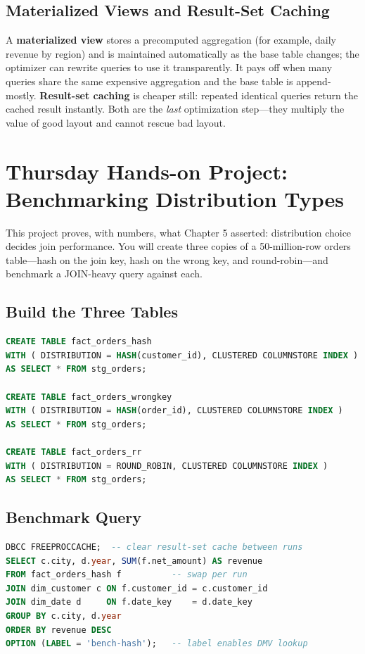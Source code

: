 \subsection{Materialized Views and Result-Set Caching}
A \textbf{materialized view} stores a precomputed aggregation (for example, daily revenue by region) and is maintained automatically as the base table changes; the optimizer can rewrite queries to use it transparently. It pays off when many queries share the same expensive aggregation and the base table is append-mostly. \textbf{Result-set caching} is cheaper still: repeated identical queries return the cached result instantly. Both are the \emph{last} optimization step---they multiply the value of good layout and cannot rescue bad layout.

\section{Thursday Hands-on Project: Benchmarking Distribution Types}
This project proves, with numbers, what Chapter 5 asserted: distribution choice decides join performance. You will create three copies of a 50-million-row orders table---hash on the join key, hash on the wrong key, and round-robin---and benchmark a JOIN-heavy query against each.

\subsection{Build the Three Tables}
\begin{lstlisting}[language=SQL,caption={Three physical designs, identical data.},label={lst:ch6-bench-setup}]
CREATE TABLE fact_orders_hash
WITH ( DISTRIBUTION = HASH(customer_id), CLUSTERED COLUMNSTORE INDEX )
AS SELECT * FROM stg_orders;

CREATE TABLE fact_orders_wrongkey
WITH ( DISTRIBUTION = HASH(order_id), CLUSTERED COLUMNSTORE INDEX )
AS SELECT * FROM stg_orders;

CREATE TABLE fact_orders_rr
WITH ( DISTRIBUTION = ROUND_ROBIN, CLUSTERED COLUMNSTORE INDEX )
AS SELECT * FROM stg_orders;
\end{lstlisting}

\subsection{Benchmark Query}
\begin{lstlisting}[language=SQL,caption={The benchmark: a star join with aggregation.},label={lst:ch6-bench-query}]
DBCC FREEPROCCACHE;  -- clear result-set cache between runs
SELECT c.city, d.year, SUM(f.net_amount) AS revenue
FROM fact_orders_hash f          -- swap per run
JOIN dim_customer c ON f.customer_id = c.customer_id
JOIN dim_date d     ON f.date_key    = d.date_key
GROUP BY c.city, d.year
ORDER BY revenue DESC
OPTION (LABEL = 'bench-hash');   -- label enables DMV lookup
\end{lstlisting}

